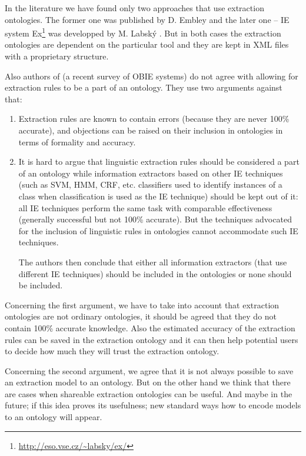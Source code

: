 \documentclass[10pt, conference, compsocconf]{IEEEtran}
\begin{document}
In the literature we have found only two approaches that use extraction ontologies. The former one was published by D. Embley \cite{DBLP:conf/er/EmbleyTL02,Embley:2004:TSU:1012294.1012295}
and the later one -- IE system Ex\footnote{\url{http://eso.vse.cz/~labsky/ex/}} was developped by M. Labsk\'{y} \cite{springerlink:10.1007/978-3-642-01891-6_5}. 
But in both cases the extraction ontologies are dependent on the particular tool and they are kept in XML files with a proprietary structure.


Also authors of \cite{citeulike:7291004} (a recent survey of OBIE systems) do not agree with allowing for extraction rules to be a part of an ontology. They use two arguments against that:
\begin{enumerate}
	\item Extraction rules are known to contain errors (because they are never 100\% accurate), and objections can be raised on their inclusion in ontologies in terms of formality and accuracy.

	\item It is hard to argue that linguistic extraction rules should be considered a part of an ontology while information extractors based on other IE techniques (such as SVM, HMM, CRF, etc. classifiers used to identify instances of a class when classification is used as the IE technique) should be kept out of it: all IE techniques perform the same task with comparable effectiveness (generally successful but not 100\% accurate). But the techniques advocated for the inclusion of linguistic rules in ontologies cannot accommodate such IE techniques.
	
The authors then conclude that either all information extractors (that use different IE techniques) should be included in the ontologies or none should be included.
\end{enumerate}



Concerning the first argument, we have to take into account that extraction ontologies are not ordinary ontologies, it should be agreed that they do not contain 100\% accurate knowledge. Also the estimated accuracy of the extraction rules can be saved in the extraction ontology and it can then help potential users to decide how much they will trust the extraction ontology.

Concerning the second argument, we agree that it is not always possible to save an extraction model to an ontology. But on the other hand we think that there are cases when shareable extraction ontologies can be useful. And maybe in the future; if this idea proves its usefulness; new standard ways how to encode models to an ontology will appear.
\end{document}
